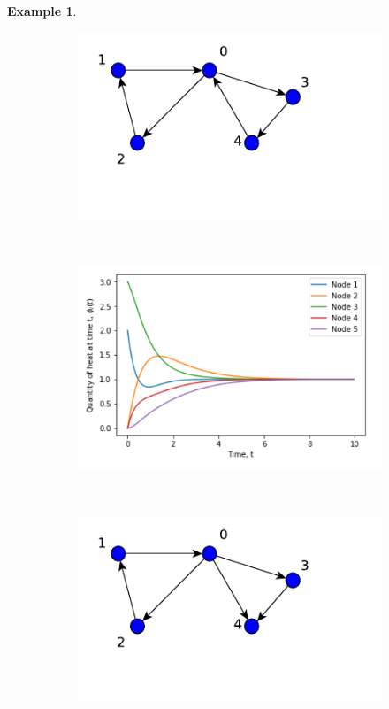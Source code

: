 \documentclass[10pt,a4paper]{article}
\theoremstyle{plain}
\theoremstyle{definition}
\newtheorem{exa}[subsection]{Example}
\begin{document}
\begin{exa}
      	\begin{figure}[H]
      		\centering
      	    \begin{subfigure}[b]{0.40\textwidth}
      	    	\includegraphics[width=\textwidth]{images/balanceDigraph.pdf}
      	    	\caption{}
      	    	\label{balanced-graph}
      	    \end{subfigure}~
      	    \begin{subfigure}[b]{0.5\textwidth}
      	    	\includegraphics[width= \textwidth]{images/Balanced-digraph-diffusion.png}
      	    	\caption{}
      	    	\label{plot-balanced}
      	    \end{subfigure} \\
            \begin{subfigure}[b]{0.40\textwidth}
            	\includegraphics[width=\textwidth]{images/UnbalanceDigraph.pdf}

\end{subfigure}
\end{figure}
\end{exa}
\end{document}
